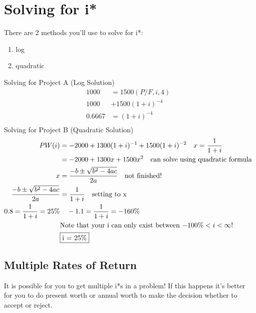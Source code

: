 \documentclass{report} %
\begin{document}
\section*{Solving for i*}
There are 2 methods you'll use to solve for i*:
\begin{enumerate}
    \item log
    \item quadratic
\end{enumerate}
Solving for Project A (Log Solution)
\begin{equation*}
    \begin{aligned}
        1000 &= 1500(P/F,i,4) \\
        1000 &+ 1500(1+i)^{-4} \\
        0.6667 &= (1+i)^{-4} \\
    \end{aligned}
\end{equation*}
Solving for Project B (Quadratic Solution)
\begin{equation*}
    \begin{aligned}
        PW(i) &= -2000 + 1300(1+i)^{-1} + 1500(1+i)^{-2} \quad x = \frac{1}{1+i} \\
                &= -2000 + 1300x + 1500x^2 \quad \text{can solve using quadratic formula} \\
        x &= \frac{-b\pm\sqrt{b^2-4ac}}{2a} \quad \text{not finished!} \\
        \frac{-b\pm\sqrt{b^2-4ac}}{2a} &= \frac{1}{1+i} \quad \text{setting to x}\\
        0.8 = \frac{1}{1+i} = 25\% & \quad -1.1 = \frac{1}{1+i} = -160\% \\
        & \text{Note that your i can only exist between $-100\% < i < \infty$!
        } \\
        &\framebox{i = 25\%}
    \end{aligned}
\end{equation*}

\subsection*{Multiple Rates of Return}
It is possible for you to get multiple i*s in a problem! 
If this happens it's better for you to do present worth or annual worth to make the decision whether to accept or reject.
\end{document}

